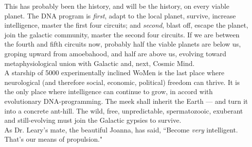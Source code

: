 This has probably been the history, and will be the history, on every viable planet. The DNA program is \emph{first}, adapt to the local planet, survive, increase intelligence, master the first four circuits; and \emph{second}, blast off, escape the planet, join the galactic community, master the second four circuits. If we are between the fourth and fifth circuits now, probably half the viable planets are below us, groping upward from amoebahood, and half are above us, evolving toward metaphysiological union with Galactic and, next, Cosmic Mind.\\
A starship of 5000 experimentally inclined WoMen is the last place where neurological (and therefore social, economic, political) freedom can thrive. It is the only place where intelligence can continue to grow, in accord with evolutionary DNA-programming. The meek shall inherit the Earth --- and turn it into a concrete ant-hill. The wild, free, unpredictable, spermatozooic, exuberant and still-evolving must join the Galactic gypsies to survive.\\
As Dr. Leary's mate, the beautiful Joanna, has said, ``Become \emph{very} intelligent. That's our means of propulsion."
 